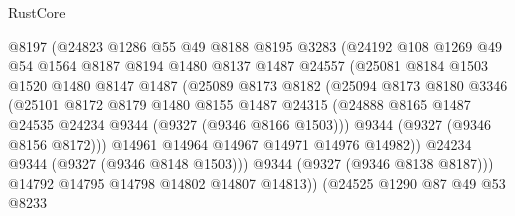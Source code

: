\begin{lexlean}{RustCore}
\begin{coremodule}
                      @8197
                      (@24823
                        @1286
                        @55
                        @49
                        @8188
                        @8195
                        @3283
                        (@24192
                          @108
                          @1269
                          @49
                          @54
                          @1564
                          @8187
                          @8194
                          @1480
                          @8137
                          @1487
                          @24557
                          (@25081
                            @8184
                            @1503
                            @1520
                            @1480
                            @8147
                            @1487
                            (@25089
                              @8173
                              @8182
                              (@25094
                                @8173
                                @8180
                                @3346
                                (@25101
                                  @8172
                                  @8179
                                  @1480
                                  @8155
                                  @1487
                                  @24315
                                  (@24888
                                    @8165
                                    @1487
                                    @24535
                                    @24234
                                    @9344
                                    (@9327 (@9346 @8166 @1503)))
                                  @9344
                                  (@9327 (@9346 @8156 @8172)))
                                @14961
                                @14964
                                @14967
                                @14971
                                @14976
                                @14982))
                            @24234
                            @9344
                            (@9327 (@9346 @8148 @1503)))
                          @9344
                          (@9327 (@9346 @8138 @8187)))
                        @14792
                        @14795
                        @14798
                        @14802
                        @14807
                        @14813))
                    (@24525
                      @1290
                      @87
                      @49
                      @53
                      @8233

\end{coremodule}
\end{lexlean}

